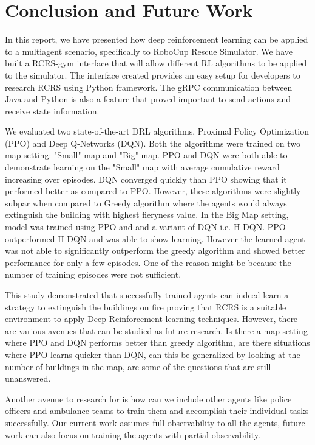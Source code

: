 \documentclass[12pt]{report}
\begin{document}
\chapter{Conclusion and Future Work}

In this report, we have presented how deep reinforcement learning can be applied to a multiagent scenario, specifically to RoboCup Rescue Simulator. We have built a RCRS-gym interface that will allow different RL algorithms to be applied to the simulator. The interface created provides an easy setup for developers to research RCRS using Python framework. The gRPC communication between Java and Python is also a feature that proved important to send actions and receive state information. 

We evaluated two state-of-the-art DRL algorithms, Proximal Policy Optimization (PPO) and Deep Q-Networks (DQN). Both the algorithms were trained on two map setting: "Small" map and "Big" map. PPO and DQN were both able to demonstrate learning on the "Small" map with average cumulative reward increasing over episodes. DQN converged quickly than PPO showing that it performed better as compared to PPO. However, these algorithms were slightly subpar when compared to Greedy algorithm where the agents would always extinguish the building with highest fieryness value. In the Big Map setting, model was trained using PPO and and a variant of DQN i.e. H-DQN. PPO outperformed H-DQN and was able to show learning. However the learned agent was not able to significantly outperform the greedy algorithm and showed better performance for only a few episodes. One of the reason might be because the number of training episodes were not sufficient. 

This study demonstrated that successfully trained agents can indeed learn a strategy to extinguish the buildings on fire proving that RCRS is a suitable environment to apply Deep Reinforcement learning techniques. However, there are various avenues that can be studied as future research. Is there a map setting where PPO and DQN performs better than greedy algorithm, are there situations where PPO learns quicker than DQN, can this be generalized by looking at the number of buildings in the map, are some of the questions that are still unanswered. 

Another avenue to research for is how can we include other agents like police officers and ambulance teams to train them and accomplish their individual tasks successfully. Our current work assumes full observability to all the agents, future work can also focus on training the agents with partial observability. 




      
\end{document}
